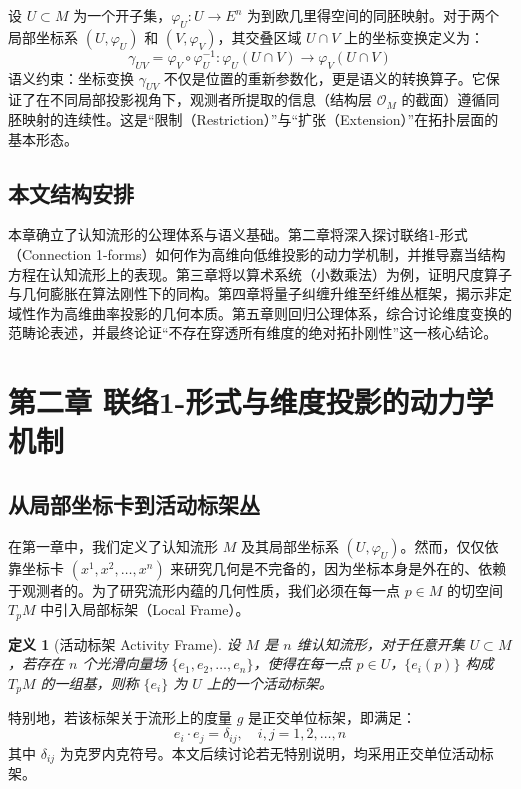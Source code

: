 \documentclass[11pt,a4paper]{article}
\newtheorem{definition}{定义}
\begin{document}
设 \(U\subset M\) 为一个开子集，\(\varphi_U:U\to E^n\) 为到欧几里得空间的同胚映射。对于两个局部坐标系 \((U,\varphi_U)\) 和 \((V,\varphi_V)\)，其交叠区域 \(U\cap V\) 上的坐标变换定义为：
\[
\gamma_{UV}=\varphi_V\circ\varphi_U^{-1}:\varphi_U(U\cap V)\to \varphi_V(U\cap V)
\]
语义约束：坐标变换 \(\gamma_{UV}\) 不仅是位置的重新参数化，更是语义的转换算子。它保证了在不同局部投影视角下，观测者所提取的信息（结构层 \(\mathcal O_M\) 的截面）遵循同胚映射的连续性。这是“限制（Restriction）”与“扩张（Extension）”在拓扑层面的基本形态。

\subsection{本文结构安排}
本章确立了认知流形的公理体系与语义基础。第二章将深入探讨联络1-形式（Connection 1-forms）如何作为高维向低维投影的动力学机制，并推导嘉当结构方程在认知流形上的表现。第三章将以算术系统（小数乘法）为例，证明尺度算子与几何膨胀在算法刚性下的同构。第四章将量子纠缠升维至纤维丛框架，揭示非定域性作为高维曲率投影的几何本质。第五章则回归公理体系，综合讨论维度变换的范畴论表述，并最终论证“不存在穿透所有维度的绝对拓扑刚性”这一核心结论。

\clearpage
\section{第二章 联络1-形式与维度投影的动力学机制}
\subsection{从局部坐标卡到活动标架丛}
在第一章中，我们定义了认知流形 \(M\) 及其局部坐标系 \((U,\varphi_U)\)。然而，仅仅依靠坐标卡 \((x^1,x^2,\dots,x^n)\) 来研究几何是不完备的，因为坐标本身是外在的、依赖于观测者的。为了研究流形内蕴的几何性质，我们必须在每一点 \(p\in M\) 的切空间 \(T_pM\) 中引入局部标架（Local Frame）。

\begin{definition}[活动标架 Activity Frame]
设 \(M\) 是 \(n\) 维认知流形，对于任意开集 \(U\subset M\)，若存在 \(n\) 个光滑向量场 \(\{e_1,e_2,\dots,e_n\}\)，使得在每一点 \(p\in U\)，\(\{e_i(p)\}\) 构成 \(T_pM\) 的一组基，则称 \(\{e_i\}\) 为 \(U\) 上的一个活动标架。
\end{definition}

特别地，若该标架关于流形上的度量 \(g\) 是正交单位标架，即满足：
\[
e_i\cdot e_j=\delta_{ij},\quad i,j=1,2,\dots,n
\]
其中 \(\delta_{ij}\) 为克罗内克符号。本文后续讨论若无特别说明，均采用正交单位活动标架。
\end{document}
